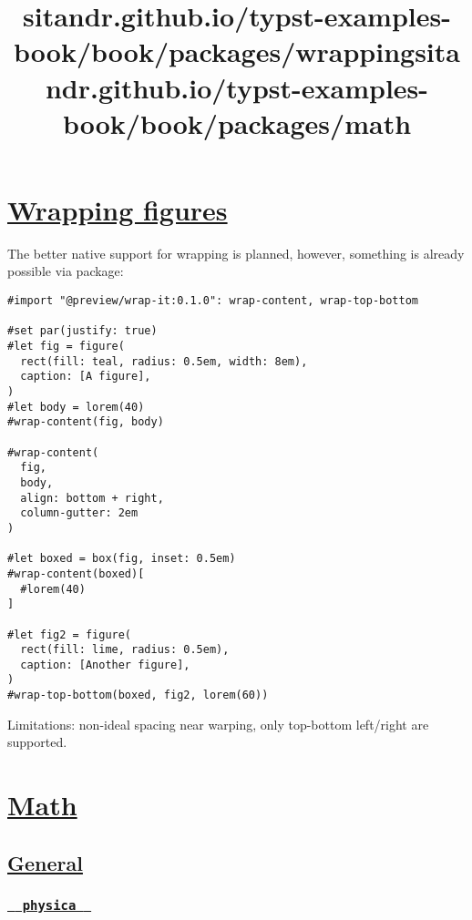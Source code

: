 \title{sitandr.github.io/typst-examples-book/book/packages/wrapping}

\section{\texorpdfstring{\hyperref[wrapping-figures]{Wrapping
figures}}{Wrapping figures}}\label{wrapping-figures}

The better native support for wrapping is planned, however, something is
already possible via package:

\begin{verbatim}
#import "@preview/wrap-it:0.1.0": wrap-content, wrap-top-bottom

#set par(justify: true)
#let fig = figure(
  rect(fill: teal, radius: 0.5em, width: 8em),
  caption: [A figure],
)
#let body = lorem(40)
#wrap-content(fig, body)

#wrap-content(
  fig,
  body,
  align: bottom + right,
  column-gutter: 2em
)

#let boxed = box(fig, inset: 0.5em)
#wrap-content(boxed)[
  #lorem(40)
]

#let fig2 = figure(
  rect(fill: lime, radius: 0.5em),
  caption: [Another figure],
)
#wrap-top-bottom(boxed, fig2, lorem(60))
\end{verbatim}

\pandocbounded{}

Limitations: non-ideal spacing near warping, only top-bottom left/right
are supported.


\title{sitandr.github.io/typst-examples-book/book/packages/math}

\section{\texorpdfstring{\hyperref[math]{Math}}{Math}}\label{math}

\subsection{\texorpdfstring{\hyperref[general]{General}}{General}}\label{general}

\subsubsection{\texorpdfstring{\hyperref[physica]{\texttt{\ }{\texttt{\ physica\ }}\texttt{\ }}}{  physica  }}\label{physica}

